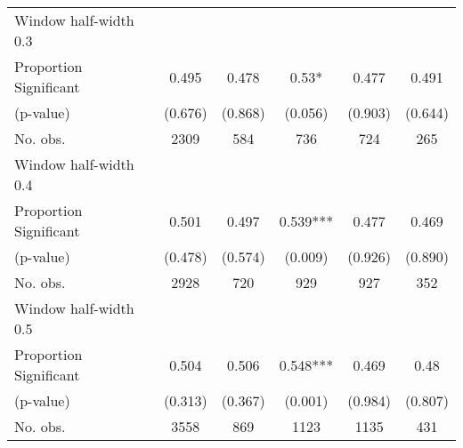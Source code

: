 \begin{tabular}{l*{5}{c}}
\hline
Window half-width 0.3\\

Proportion Significant& 0.495 &  0.478 &  0.53* &  0.477 &  0.491\\

(p-value) & (0.676) &  (0.868) &  (0.056) &  (0.903) &  (0.644)\\

No. obs.& 2309 &  584 &  736 &  724 &  265\\

\hline
Window half-width 0.4\\

Proportion Significant& 0.501 &  0.497 &  0.539*** &  0.477 &  0.469\\

(p-value) & (0.478) &  (0.574) &  (0.009) &  (0.926) &  (0.890)\\

No. obs.& 2928 &  720 &  929 &  927 &  352\\

\hline
Window half-width 0.5\\

Proportion Significant& 0.504 &  0.506 &  0.548*** &  0.469 &  0.48\\

(p-value) & (0.313) &  (0.367) &  (0.001) &  (0.984) &  (0.807)\\

No. obs.& 3558 &  869 &  1123 &  1135 &  431\\

\hline\hline
\end{tabular}


